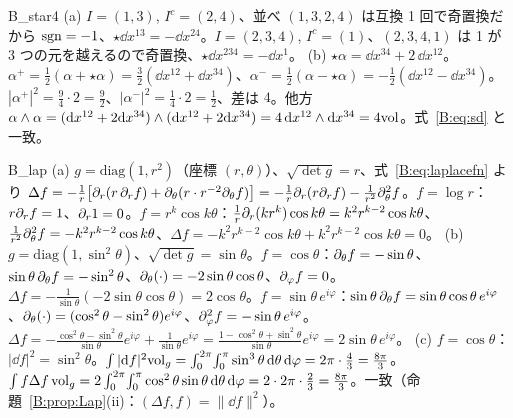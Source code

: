\begin{soll}{B_star4}
(a) $I=(1,3)$, $I^c=(2,4)$、並べ $(1,3,2,4)$ は互換 1 回で奇置換だから $\operatorname{sgn}=-1$、$\star\dd x^{13}=-\dd x^{24}$。$I=(2,3,4)$, $I^c=(1)$、$(2,3,4,1)$ は 1 が 3 つの元を越えるので奇置換、$\star\dd x^{234}=-\dd x^1$。
(b) $\star\alpha=\dd x^{34}+2\,\dd x^{12}$。$\alpha^+=\frac12(\alpha+\star\alpha)=\frac32(\dd x^{12}+\dd x^{34})$、$\alpha^-=\frac12(\alpha-\star\alpha)=-\frac12(\dd x^{12}-\dd x^{34})$。$|\alpha^+|^2=\frac94\cdot2=\frac92$、$|\alpha^-|^2=\frac14\cdot2=\frac12$、差は $4$。他方 $\alpha\wedge\alpha=(\mathrm{d} x^{12}+2\mathrm{d} x^{34})\wedge(\mathrm{d} x^{12}+2\mathrm{d} x^{34})=4\,\mathrm{d} x^{12}\wedge\mathrm{d} x^{34}=4\mathrm{vol}$。式~\eqref{B:eq:sd} と一致。
\end{soll}

\begin{soll}{B_lap}
(a) $g=\mathrm{diag}(1,r^2)$（座標 $(r,\theta)$）、$\sqrt{\det g}=r$、式~\eqref{B:eq:laplacefn} より $\Delta f=-\frac1r\bigl[\partial_r(r\,\partial_rf)+\partial_\theta(r\cdot r^{-2}\partial_\theta f)\bigr]=-\frac1r\partial_r(r\partial_rf)-\frac1{r^2}\partial_\theta^2f$。$f=\log r$：$r\partial_rf=1$、$\partial_r1=0$。$f=r^k\cos k\theta$：$\frac1r\partial_r(kr^k)\cos k\theta=k^2r^{k-2}\cos k\theta$、$\frac1{r^2}\partial_\theta^2f=-k^2r^{k-2}\cos k\theta$、$\Delta f=-k^2r^{k-2}\cos k\theta+k^2r^{k-2}\cos k\theta=0$。
(b) $g=\mathrm{diag}(1,\sin^2\theta)$、$\sqrt{\det g}=\sin\theta$。$f=\cos\theta$：$\partial_\theta f=-\sin\theta$、$\sin\theta\,\partial_\theta f=-\sin^2\theta$、$\partial_\theta(\cdot)=-2\sin\theta\cos\theta$、$\partial_\varphi f=0$。$\Delta f=-\frac1{\sin\theta}(-2\sin\theta\cos\theta)=2\cos\theta$。$f=\sin\theta\,e^{i\varphi}$：$\sin\theta\,\partial_\theta f=\sin\theta\cos\theta\,e^{i\varphi}$、$\partial_\theta(\cdot)=(\cos^2\theta-\sin^2\theta)e^{i\varphi}$、$\partial_\varphi^2f=-\sin\theta\,e^{i\varphi}$。$\Delta f=-\frac{\cos^2\theta-\sin^2\theta}{\sin\theta}e^{i\varphi}+\frac{1}{\sin\theta}e^{i\varphi}=\frac{1-\cos^2\theta+\sin^2\theta}{\sin\theta}e^{i\varphi}=2\sin\theta\,e^{i\varphi}$。
(c) $f=\cos\theta$：$|\dd f|^2=\sin^2\theta$。$\int|\mathrm{d} f|^2\mathrm{vol}_g=\int_0^{2\pi}\!\int_0^\pi\sin^3\theta\,\mathrm{d}\theta\,\mathrm{d}\varphi=2\pi\cdot\frac43=\frac{8\pi}3$。$\int f\Delta f\,\mathrm{vol}_g=2\int_0^{2\pi}\!\int_0^\pi\cos^2\theta\sin\theta\,\mathrm{d}\theta\,\mathrm{d}\varphi=2\cdot2\pi\cdot\frac23=\frac{8\pi}3$。一致（命題~\ref{B:prop:Lap}(ii)：$(\Delta f,f)=\|\dd f\|^2$）。
\end{soll}

